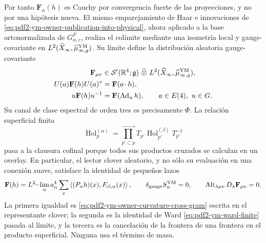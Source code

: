 Por tanto $\mathbf F_\alpha(h)$ es Cauchy por convergencia fuerte de las proyecciones,
y no por una hipótesis nueva. El mismo emparejamiento de Haar e innovaciones de
\eqref{eq:pdf2-ym-owner-publication-into-physical}, ahora aplicado a la base
ortonormalizada de $G_{\alpha,c}^{F}$, realiza el colímite mediante una isometría
local y gauge-covariante en
$L^2(\widehat X_\infty,\widehat\mu_{\infty,g}^{\rm YM})$. Su límite define la
distribución aleatoria
gauge-covariante
\begin{equation}\label{eq:pdf2-ym-owner-distributional-curvature}
\begin{aligned}
 \mathbf F_{\mu\nu}&\in
 \mathcal S'(\mathbb R^4;\mathfrak g)\ \widehat\otimes\
 L^2(\widehat X_\infty,\widehat\mu_{\infty,g}^{\rm YM}),\\
 U(a)\mathbf F(h)U(a)^*&=\mathbf F(a\!\cdot h),\\
 u\mathbf F(h)u^{-1}&=\mathbf F(\operatorname{Ad}_u h),
 \qquad a\in E(4),\ u\in G.
\end{aligned}
\end{equation}
Su canal de clase espectral de orden tres es precisamente $\Phi$. La relación
superficial finita
\begin{equation}\label{eq:pdf2-ym-owner-surface-product}
 \operatorname{Hol}^{(\alpha)}_p
 =\prod_{p'\subset p}^{\longrightarrow}
  T_{p'}\operatorname{Hol}^{(\beta)}_{p'}T_{p'}^{-1}
\end{equation}
pasa a la clausura cofinal porque todos sus productos cruzados se calculan en un
overlay. En particular, el lector clover aleatorio, y no sólo su evaluación en una
conexión suave, satisface la identidad de pequeños lazos
\begin{equation}\label{eq:pdf2-ym-owner-holonomy-curvature-relation}
 \mathbf F(h)=L^2\!\mathord{-}\!\lim_{\alpha}
 a_\alpha^4\sum_x
 \left\langle(P_\alpha h)(x),F_{{\rm cl},\alpha}(x)\right\rangle,
 \qquad
 \delta_{\rm gauge}S_n^{\rm YM}=0,
 \qquad
 \operatorname{Alt}_{\lambda\mu\nu}D_\lambda\mathbf F_{\mu\nu}=0.
\end{equation}
La primera igualdad es \eqref{eq:pdf2-ym-owner-curvature-cross-gram} escrita en el
representante clover; la segunda es la identidad de Ward
\eqref{eq:pdf2-ym-ward-finite} pasada al límite, y la
tercera es la cancelación de la frontera de una frontera en el producto superficial.
Ninguna usa el término de masa.

